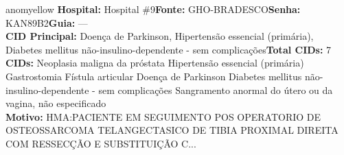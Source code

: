 \documentclass[a4paper,10pt]{article}
\begin{document}
\begin{anomalycard}[Interna\c{c}\~{a}o \#120793 | Pac. \#21435 | MODERADO (z=2.02) | LOS: 2d | 09/03/2026\,$\to$\,11/03/2026]{anomyellow}
\textbf{Hospital:} Hospital \#9\quad \textbf{Fonte:} GHO-BRADESCO\quad \textbf{Senha:} KAN89B2\quad \textbf{Guia:} ---\\

\textbf{CID Principal:} {\small Doença de Parkinson, Hipertensão essencial (primária), Diabetes mellitus não-insulino-dependente - sem complicações}\quad\textbf{Total CIDs:} 7\\

\textbf{CIDs:} {\scriptsize Neoplasia maligna da próstata \textbar{} Hipertensão essencial (primária) \textbar{} Gastrostomia \textbar{} Fístula articular \textbar{} Doença de Parkinson \textbar{} Diabetes mellitus não-insulino-dependente - sem complicações \textbar{} Sangramento anormal do útero ou da vagina, não especificado}\\

\textbf{Motivo:} {\scriptsize HMA:PACIENTE EM SEGUIMENTO POS OPERATORIO DE OSTEOSSARCOMA TELANGECTASICO DE TIBIA PROXIMAL DIREITA COM RESSECÇÃO E SUBSTITUIÇÃO C...}\\




\end{anomalycard}
\end{document}
